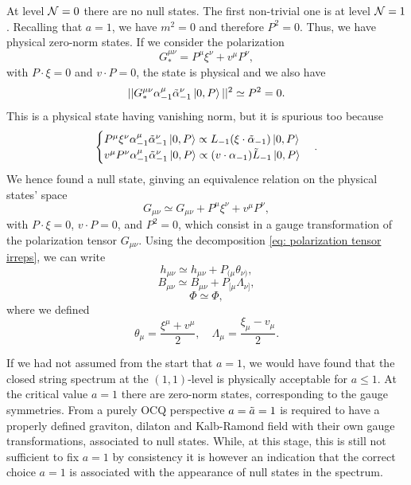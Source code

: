 At level $\mathcal{N} = 0$ there are no null states. The first non-trivial one is at level $\mathcal{N} = 1$. Recalling that $a = 1$, we have $m^2 = 0$ and therefore $P^2 = 0$. Thus, we have physical zero-norm states. If we consider the polarization
\begin{equation}
    G_*^{\mu\nu} = P^\mu\xi^\nu + v^\mu P^\nu,
\end{equation}
with $P \cdot \xi = 0$ and $v \cdot P = 0$, the state is physical and we also have 
\begin{equation}
    ||G_*^{\mu\nu}\alpha^\mu_{-1}\tilde{\alpha}^\nu_{-1}\ket{0,P}||^2 \simeq P^2 = 0.
\end{equation}
This is a physical state having vanishing norm, but it is spurious too because
\begin{equation}
    \begin{cases}
        P^\mu\xi^\nu\alpha^\mu_{-1}\tilde{\alpha}^\nu_{-1}\ket{0,P} \propto L_{-1}(\xi \cdot \tilde{\alpha}_{-1})\ket{0,P} \\
        v^\mu P^\nu \alpha^\mu_{-1}\tilde{\alpha}^\nu_{-1}\ket{0,P} \propto (v \cdot \alpha_{-1})\tilde{L}_{-1}\ket{0,P}
    \end{cases}.
\end{equation}
We hence found a null state, ginving an equivalence relation on the physical states' space
\begin{equation}
    G_{\mu\nu} \simeq G_{\mu\nu} + P^\mu\xi^\nu + v^\mu P^\nu,
\end{equation}
with $P \cdot \xi = 0$, $v \cdot P = 0$, and $P^2 = 0$, which consist in a gauge transformation of the polarization tensor $G_{\mu\nu}$. Using the decomposition \eqref{eq: polarization tensor irreps}, we can write 
\begin{equation}
    h_{\mu\nu} \simeq h_{\mu\nu} + P_{(\mu}\theta_{\nu)},
\end{equation}
\begin{equation}
    B_{\mu\nu} \simeq B_{\mu\nu} + P_{[\mu}\Lambda_{\nu]},
\end{equation}
\begin{equation}
    \Phi \simeq \Phi,
\end{equation}
where we defined 
\begin{equation}
    \theta_\mu = \frac{\xi^\mu + v^\mu}{2},\quad \Lambda_\mu = \frac{\xi_\mu - v_\mu}{2}.
\end{equation}
\begin{obs}
    If we had not assumed from the start that $a = 1$, we would have found that the closed string spectrum at the $(1,1)$-level is physically acceptable for $a \le 1$. At the critical value $a = 1$ there are zero-norm states, corresponding to the gauge symmetries. From a purely OCQ perspective $a = \tilde{a} = 1$ is required to have a properly defined graviton, dilaton and Kalb-Ramond field with their own gauge transformations, associated to null states. While, at this stage, this is still not sufficient to fix $a = 1$ by consistency it is however an indication that the correct choice $a = 1$ is associated with the appearance of null states in the spectrum.
\end{obs}
